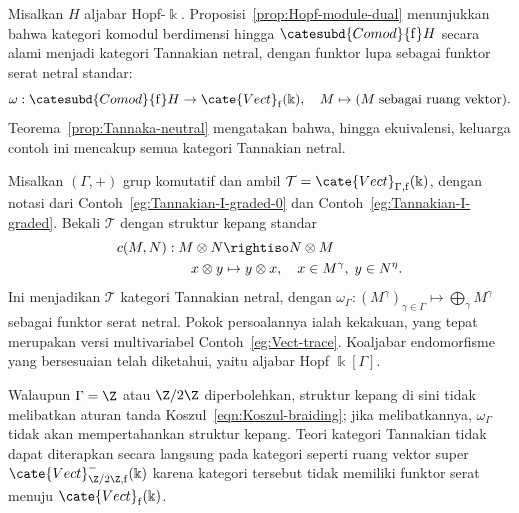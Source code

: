 \begin{example}
	Misalkan $H$ aljabar Hopf-$\Bbbk$.
	Proposisi~\ref{prop:Hopf-module-dual} menunjukkan bahwa kategori
	komodul berdimensi hingga $\catesubd{Comod}{\mathrm f}H$ secara alami
	menjadi kategori Tannakian netral, dengan funktor lupa sebagai funktor
	serat netral standar:
	\[ \omega: \catesubd{Comod}{\mathrm{f}}H \to \cate{Vect}_{\mathrm{f}}(\Bbbk), \quad M \mapsto (M\;\text{sebagai ruang vektor}). \]
	Teorema~\ref{prop:Tannaka-neutral} mengatakan bahwa, hingga ekuivalensi,
	keluarga contoh ini mencakup semua kategori Tannakian netral.
\end{example}

\begin{example}
	Misalkan $(\Gamma,+)$ grup komutatif dan ambil
	$\mathcal{T}=\cate{Vect}_{\Gamma,\mathrm f}(\Bbbk)$, dengan notasi dari
	Contoh~\ref{eg:Tannakian-I-graded-0} dan
	Contoh~\ref{eg:Tannakian-I-graded}. Bekali $\mathcal{T}$ dengan struktur
	kepang standar
	\begin{align*}
		c(M, N): M \otimes N & \rightiso N \otimes M \\
		x \otimes y & \mapsto y \otimes x, \quad x \in M^\gamma, \; y \in N^\eta.
	\end{align*}
	Ini menjadikan $\mathcal{T}$ kategori Tannakian netral, dengan
	$\omega_\Gamma:(M^\gamma)_{\gamma\in\Gamma}\mapsto
	\bigoplus_\gamma M^\gamma$ sebagai funktor serat netral. Pokok persoalannya ialah
	kekakuan, yang tepat merupakan versi multivariabel
	Contoh~\ref{eg:Vect-trace}. Koaljabar endomorfisme yang bersesuaian telah
	diketahui, yaitu aljabar Hopf $\Bbbk[\Gamma]$.

	Walaupun $\Gamma=\Z$ atau $\Z/2\Z$ diperbolehkan, struktur kepang di
	sini tidak melibatkan aturan tanda Koszul~\eqref{eqn:Koszul-braiding};
	jika melibatkannya, $\omega_\Gamma$ tidak akan mempertahankan struktur
	kepang. Teori kategori Tannakian tidak dapat diterapkan secara langsung
	pada kategori seperti ruang vektor super
	$\cate{Vect}^-_{\Z/2\Z,\mathrm f}(\Bbbk)$ karena kategori tersebut tidak
	memiliki funktor serat menuju $\cate{Vect}_{\mathrm f}(\Bbbk)$.
\end{example}

